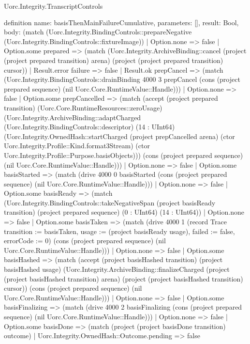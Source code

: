 \begin{lexlean}{Uorc.Integrity.TranscriptControls}
\begin{semanticmodule}
definition{
  name: basisThenMainFailureCumulative,
  parameters: [],
  result: Bool,
  body: (match (Uorc.Integrity.BindingControls::prepareNegative (Uorc.Integrity.BindingControls::fixtureImage))
    | Option.none => false
    | Option.some prepared => (match (Uorc.Integrity.ArchiveBinding::cancel (project (project prepared transition) arena) (project (project prepared transition) cursor))
      | Result.error failure => false
      | Result.ok prepCancel => (match (Uorc.Integrity.BindingControls::drainBinding 4000 3 prepCancel (cons (project prepared sequence) (nil Uorc.Core.RuntimeValue::Handle)))
        | Option.none => false
        | Option.some prepCancelled => (match (accept (project prepared transition) (Uorc.Core.RuntimeResources::zeroUsage) (Uorc.Integrity.ArchiveBinding::adaptCharged (Uorc.Integrity.BindingControls::descriptor) (14 : UInt64) (Uorc.Integrity.OwnedHash::startCharged (project prepCancelled arena) (ctor Uorc.Integrity.Profile::Kind.format3Stream) (ctor Uorc.Integrity.Profile::Purpose.basisObjects))) (cons (project prepared sequence) (nil Uorc.Core.RuntimeValue::Handle)))
          | Option.none => false
          | Option.some basisStarted => (match (drive 4000 0 basisStarted (cons (project prepared sequence) (nil Uorc.Core.RuntimeValue::Handle)))
            | Option.none => false
            | Option.some basisReady => (match (Uorc.Integrity.BindingControls::takeNegativeSpan (project basisReady transition) (project prepared sequence) (0 : UInt64) (14 : UInt64))
              | Option.none => false
              | Option.some basisTaken => (match (drive 4000 1 (record Trace {transition := basisTaken, usage := (project basisReady usage), failed := false, errorCode := 0}) (cons (project prepared sequence) (nil Uorc.Core.RuntimeValue::Handle)))
                | Option.none => false
                | Option.some basisHashed => (match (accept (project basisHashed transition) (project basisHashed usage) (Uorc.Integrity.ArchiveBinding::finalizeCharged (project (project basisHashed transition) arena) (project (project basisHashed transition) cursor)) (cons (project prepared sequence) (nil Uorc.Core.RuntimeValue::Handle)))
                  | Option.none => false
                  | Option.some basisFinalizing => (match (drive 4000 2 basisFinalizing (cons (project prepared sequence) (nil Uorc.Core.RuntimeValue::Handle)))
                    | Option.none => false
                    | Option.some basisDone => (match (project (project basisDone transition) outcome)
                      | Uorc.Integrity.OwnedHash::Outcome.pending => false
}
\end{semanticmodule}
\end{lexlean}
